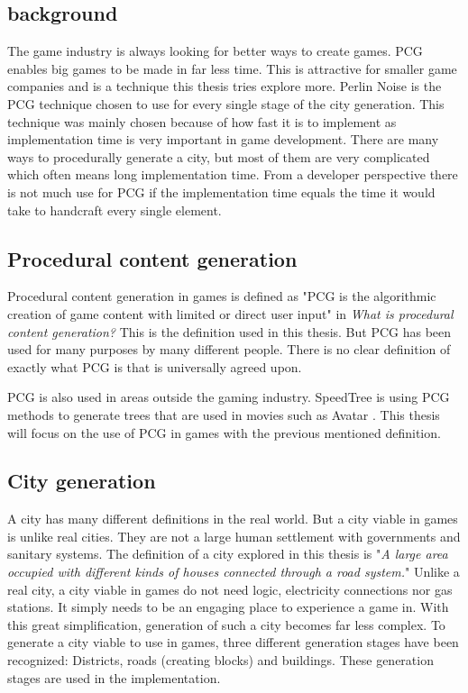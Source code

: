 	\subsection{background}
	The game industry is always looking for better ways to create games. PCG enables big games to be made in far less time. This is attractive for smaller game companies and is a technique this thesis tries explore more.
	Perlin Noise is the PCG technique chosen to use for every single stage of the city generation. This technique was mainly chosen because of how fast it is to implement as implementation time is very important in game development.
	There are many ways to procedurally generate a city, but most of them are very complicated which often means long implementation time. From a developer perspective there is not much use for PCG if the implementation time equals the time it would take to handcraft every single element.
	
	\subsection{Procedural content generation}
	Procedural content generation in games is defined as "PCG is the algorithmic creation of game content with limited or direct user input" in \textit{What is procedural content generation?} \cite{WhatIsPCG} This is the definition used in this thesis. But PCG has been used for many purposes by many different people. There is no clear definition of exactly what PCG is that is universally agreed upon.\cite{WhatIsPCG}
	
	PCG is also used in areas outside the gaming industry. SpeedTree \cite{SpeedTree} is using PCG methods to generate trees that are used in movies such as Avatar \cite{SpeedTreeMovies}.
	This thesis will focus on the use of PCG in games with the previous mentioned definition.
	
	\subsection{City generation}
	A city has many different definitions in the real world. But a city viable in games is unlike real cities. They are not a large human settlement with governments and sanitary systems. The definition of a city explored in this thesis is "\textit{A large area occupied with different kinds of houses connected through a road system.}"
	Unlike a real city, a city viable in games do not need logic, electricity connections nor gas stations. It simply needs to be an engaging place to experience a game in. With this great simplification, generation of such a city becomes far less complex.
	To generate a city viable to use in games, three different generation stages have been recognized: Districts, roads (creating blocks) and buildings. These generation stages are used in the implementation.
	

